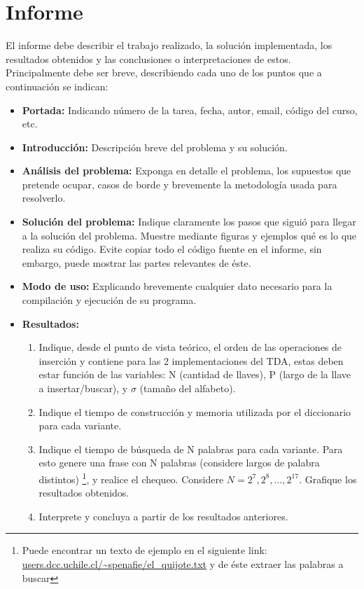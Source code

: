 \documentclass[dcc]{fcfmcourse}
\begin{document}
\newpage
\section{Informe}

El informe debe describir el trabajo realizado, la solución implementada, los resultados obtenidos
y las conclusiones o interpretaciones de estos. Principalmente debe ser breve, describiendo cada uno
de los puntos que a continuación se indican:

\begin{itemize}
    \item \textbf{Portada:} Indicando número de la tarea, fecha, autor, email, código del curso, etc.
    \item \textbf{Introducción:} Descripción breve del problema y su solución.
    \item \textbf{Análisis del problema:} Exponga en detalle el problema, los supuestos que pretende ocupar, casos de borde y brevemente la metodología usada para resolverlo.
    \item \textbf{Solución del problema:} Indique claramente los pasos que siguió para llegar a la solución
    del problema. Muestre mediante figuras y ejemplos qué es lo que realiza su código. Evite copiar todo el código fuente en el informe, sin embargo, puede mostrar las partes relevantes de éste.
    \item \textbf{Modo de uso:} Explicando brevemente cualquier dato necesario para la compilación y
    ejecución de su programa.
    \item \textbf{Resultados:} 
    \begin{enumerate}
        \item Indique, desde el punto de vista teórico, el orden de las operaciones de inserción y contiene para las 2 implementaciones del TDA, estas deben estar función de las variables: N (cantidad de llaves), P (largo de la llave a insertar/buscar), y $\sigma$ (tamaño del alfabeto).
        \item Indique el tiempo de construcción y memoria utilizada por el diccionario para cada variante.
        \item Indique el tiempo de búsqueda de N palabras para cada variante. Para esto genere una frase con N palabras (considere largos de palabra distintos) \footnote{Puede encontrar un texto de ejemplo en el siguiente link: \url{users.dcc.uchile.cl/~spenafie/el\_quijote.txt} y de éste extraer las palabras a buscar}, y realice el chequeo. Considere $N = 2^7, 2^8, \dots, 2^{17}$. Grafique los resultados obtenidos.
        \item Interprete y concluya a partir de los resultados anteriores.
    \end{enumerate}


\end{itemize}
\end{document}
